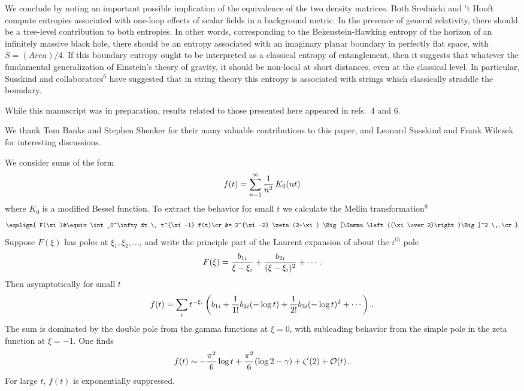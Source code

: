 We conclude by noting an important possible
implication of the equivalence of
the two density matrices.
Both Srednicki and 't Hooft compute entropies associated
with one-loop effects of scalar fields in a background metric.  In the
presence of general relativity, there should be a tree-level contribution
to both entropies.  In other words, corresponding to the Bekenstein-Hawking
entropy of the horizon of an infinitely massive black hole,
there should be an entropy associated
with an imaginary planar boundary in perfectly flat space, with $S=(Area)/4$.
If this boundary entropy ought to be interpreted as a classical
entropy of entanglement, then it suggests that whatever the
fundamental generalization of Einstein's theory of gravity, it should be
non-local at short distances, even at the classical level.
In particular, Susskind and collaborators$^6$ have suggested that
in string theory this entropy is associated  with strings which
classically straddle the boundary.


While this manuscript was in preparation, results related to those presented
here appeared in refs.~4 and 6.


\bigskip
\goodbreak
{}
\nobreak
\medskip
\nobreak
We thank Tom Banks and Stephen Shenker for their many valuable contributions
to this paper, and Leonard Susskind and Frank Wilczek for
interesting discussions.


\bigskip
\goodbreak
{}
\nobreak
\medskip
\nobreak

We consider sums of the form
$$f(t) = \sum_{n = 1}^\infty {1 \over n^2} \, K_0(nt)$$
where $K_0$ is a modified Bessel function.
To extract the behavior for small $t$ we calculate the Mellin
transformation$^9$
$$\eqalign{
F(\xi)&\equiv \int_0^\infty dt \, t^{\xi-1} f(t)\cr
            &= 2^{\xi-2} \zeta(2+\xi) \Big[\Gamma\left({\xi \over
2}\right)\Big]^2 \,.\cr}$$
Suppose $F(\xi)$ has poles at
$\xi_1,\xi_2,\ldots$, and write the principle part of the Laurent expansion
of about the $i^{th}$ pole
$$F(\xi) = {b_{1i} \over \xi - \xi_i} + {b_{2i} \over (\xi - \xi_i)^2}
             + \cdots \,. $$
Then asymptotically for small $t$
$$f(t) = \sum_i t^{- \xi_i} \left(b_{1i} + {1 \over 1!} b_{2i} (-\log t)
                  + {1 \over 2!} b_{3i} (-\log t)^2 + \cdots\right) \, .$$
The sum is dominated by the double pole
from the gamma functions at $\xi = 0$, with subleading behavior
from the simple pole in the zeta function at $\xi=-1$. One finds
$$f(t) \sim -{\pi^2 \over 6} \log t + {\pi^2 \over 6}(\log 2 - \gamma)
                   + \zeta'(2) + {\cal O}(t) \,.$$
For large $t$, $f(t)$ is exponentially suppressed.

